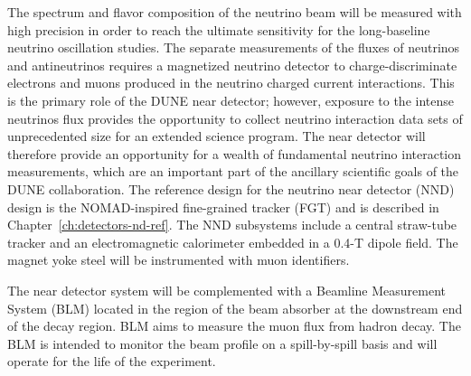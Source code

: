 The spectrum and flavor composition of the neutrino beam will be
measured with high precision in order to reach the ultimate
sensitivity for the long-baseline neutrino oscillation studies.  The
separate measurements of the fluxes of neutrinos and antineutrinos requires a
magnetized neutrino detector to charge-discriminate electrons and
muons produced in the neutrino charged current interactions.  This is
the primary role of the DUNE near detector; %
however, exposure
to the intense neutrinos flux provides the opportunity to collect
neutrino interaction data sets of unprecedented size for an extended
science program.  The near detector will therefore provide an
opportunity for a wealth of fundamental neutrino interaction
measurements, which are an important part of the ancillary %
scientific
goals of the DUNE collaboration.  The reference design for the
neutrino near detector (NND) design is the NOMAD-inspired fine-grained
tracker (FGT) and is described in
Chapter~\ref{ch:detectors-nd-ref}. The NND subsystems include a
central straw-tube tracker and an electromagnetic calorimeter embedded
in a 0.4-T dipole field. The magnet yoke steel will be instrumented
with muon identifiers.

The near detector system will be complemented with a Beamline
Measurement System (BLM) located in the region of the beam absorber at
the downstream end of the decay region. BLM aims to measure the muon
flux from hadron decay.  The BLM is intended to monitor the beam
profile on a spill-by-spill basis and will operate for the life of
the experiment.
